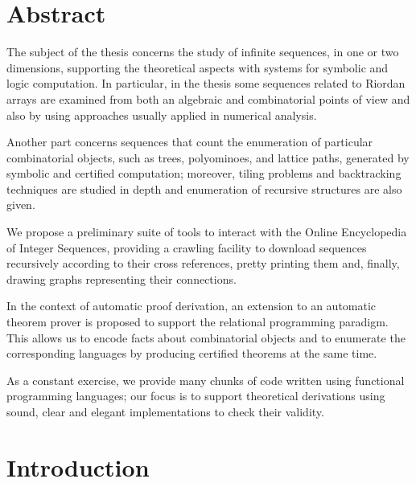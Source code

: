 \documentclass[a4paper,10pt]{tufte-book}
\begin{document}
\blankpage



\blankpage



\cleardoublepage



\cleardoublepage

\chapter*{Abstract}

The subject of the thesis concerns the study of infinite sequences, in one or
two dimensions, supporting the theoretical aspects with systems for symbolic
and logic computation. In particular, in the thesis some sequences related to
Riordan arrays are examined from both an algebraic and combinatorial points of
view and also by using approaches usually applied in numerical analysis.

Another part concerns sequences that count the enumeration of particular
combinatorial objects, such as trees, polyominoes, and lattice paths,
generated by symbolic and certified computation; moreover, tiling problems
and backtracking techniques are studied in depth and enumeration of recursive
structures are also given.

We propose a preliminary suite of tools to interact with the Online
Encyclopedia of Integer Sequences, providing a crawling facility to download
sequences recursively according to their cross references, pretty printing them
and, finally, drawing graphs representing their connections.

In the context of automatic proof derivation, an extension to an automatic
theorem prover is proposed to support the relational programming paradigm.
This allows us to encode facts about combinatorial objects and to enumerate the
corresponding languages by producing certified theorems at the same time.

As a constant exercise, we provide many chunks of code written using functional
programming languages; our focus is to support theoretical derivations using
sound, clear and elegant implementations to check their validity.

\tableofcontents

\listoftables



\cleardoublepage

\chapter*{Introduction}

\end{document}
